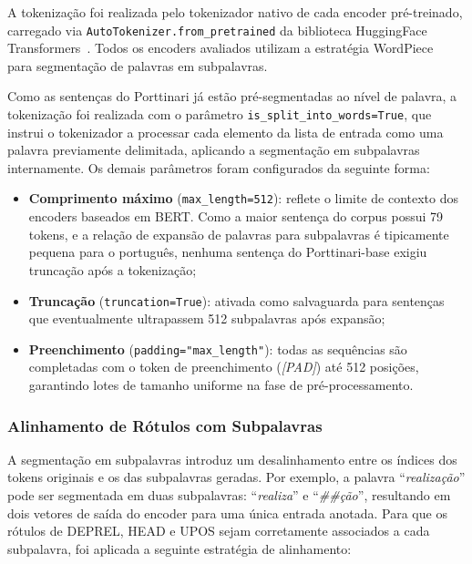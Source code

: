 A tokenização foi realizada pelo tokenizador nativo de cada encoder pré-treinado, carregado
via \texttt{AutoTokenizer.from\_pretrained} da biblioteca HuggingFace
Transformers~\citep{wolf2020transformers}. Todos os encoders avaliados utilizam a estratégia
WordPiece~\citep{wu2016google} para segmentação de palavras em subpalavras.

Como as sentenças do Porttinari já estão pré-segmentadas ao nível de palavra, a tokenização
foi realizada com o parâmetro \texttt{is\_split\_into\_words=True}, que instrui o tokenizador
a processar cada elemento da lista de entrada como uma palavra previamente delimitada,
aplicando a segmentação em subpalavras internamente. Os demais parâmetros foram configurados
da seguinte forma:

\begin{itemize}
    \item \textbf{Comprimento máximo} (\texttt{max\_length=512}): reflete o limite de contexto
          dos encoders baseados em BERT. Como a maior sentença do corpus possui 79 tokens, e
          a relação de expansão de palavras para subpalavras é tipicamente pequena para o
          português, nenhuma sentença do Porttinari-base exigiu truncação após a tokenização;
    \item \textbf{Truncação} (\texttt{truncation=True}): ativada como salvaguarda para
          sentenças que eventualmente ultrapassem 512 subpalavras após expansão;
    \item \textbf{Preenchimento} (\texttt{padding="max\_length"}): todas as sequências são
          completadas com o token de preenchimento (\textit{[PAD]}) até 512 posições,
          garantindo lotes de tamanho uniforme na fase de pré-processamento.
\end{itemize}

\subsubsection*{Alinhamento de Rótulos com Subpalavras}

A segmentação em subpalavras introduz um desalinhamento entre os índices dos tokens originais
e os das subpalavras geradas. Por exemplo, a palavra ``\textit{realização}'' pode ser
segmentada em duas subpalavras: ``\textit{realiza}'' e ``\textit{\#\#ção}'', resultando em
dois vetores de saída do encoder para uma única entrada anotada. Para que os rótulos de
DEPREL, HEAD e UPOS sejam corretamente associados a cada subpalavra, foi aplicada a seguinte
estratégia de alinhamento:

